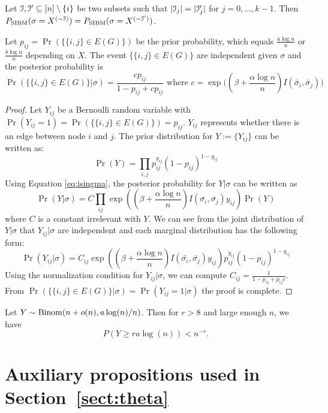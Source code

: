 \documentclass{article}
\begin{document}
\begin{lemma} \label{lm:cc}
Let $\mathcal{I},\mathcal{I}'\subseteq[n]\setminus\{i\}$ be two subsets such that $|\mathcal{I}_j|=|\mathcal{I}_j'|$ for $j=0,\dots,k-1$. 
Then $P_{\operatorname{SIBM}}(\sigma=X^{(\sim\mathcal{I})}) = P_{\operatorname{SIBM}}(\sigma=X^{(\sim\mathcal{I}')})$.
\end{lemma}

\begin{lemma}\label{lem:post_independent}
Let $p_{ij}=\Pr(\{\{i,j\} \in E(G) \})$ be the prior probability, which equals $\frac{a\log n}{n}$ or $\frac{b\log n}{n}$ depending on $X$.
The event $\{\{i,j\} \in E(G) \}$ are independent given $\sigma$ and the posterior probability is
\begin{equation}
\Pr(\{\{i,j\} \in E(G) \} | \sigma) = \frac{c p_{ij} }{1-p_{ij} + cp_{ij}} \text{ where  } c= \exp\Big((\beta + \frac{\alpha \log n}{n} ) I(\bar{\sigma}_i, \bar{\sigma}_j) \Big)
\end{equation}
\end{lemma}
\begin{proof}
Let $Y_{ij}$ be a Bernoulli random variable with $\Pr(Y_{ij} = 1) = \Pr(\{\{i,j\} \in E(G)\}) = p_{ij}$. $Y_{ij}$ represents whether there is an edge between node $i$ and $j$.
The prior distribution for $Y:=\{Y_{ij}\}$ can be written as:
$$
\Pr(Y) = \prod_{i,j} p_{ij}^{y_{ij}} (1-p_{ij})^{1-y_{ij}}
$$ 
Using Equation \eqref{eq:isingma}, the posterior probability for $Y| \sigma$ can be written as
$$
\Pr(Y|\sigma) = C\prod_{ij} \exp((\beta + \frac{\alpha \log n}{n})I(\bar{\sigma_i}, \bar{\sigma_j} )y_{ij}) \Pr(Y)
$$
where $C$ is a constant irrelevant with $Y$.
We can see from the joint distribution of $Y|\sigma$ that $Y_{ij} | \sigma$ are independent and each marginal distribution has the following form:
$$
\Pr(Y_{ij} | \sigma) = C_{ij} \exp((\beta + \frac{\alpha \log n}{n})I(\bar{\sigma_i}, \bar{\sigma_j} )y_{ij}) p_{ij}^{y_{ij}} (1-p_{ij})^{1-y_{ij}}
$$
Using the normalization condition for $Y_{ij} | \sigma $, we can compute $C_{ij} = \frac{1}{1-p_{ij} + p_{ij}c}$. From $\Pr(\{\{i,j\} \in E(G) \} | \sigma) =\Pr(Y_{ij}=1|\sigma)$ the proof is complete.
\end{proof}


\begin{lemma} \label{lm:bmd}
Let $Y\sim \operatorname{Binom}(n + o(n), a\log(n)/n)$. Then for $r>8$ and large enough $n$, we have
$$
P(Y\ge r a \log(n)) < n^{-r} .
$$
\end{lemma}
\section{Auxiliary propositions used in Section~\ref{sect:theta}}\label{ap:um}
\end{document}
